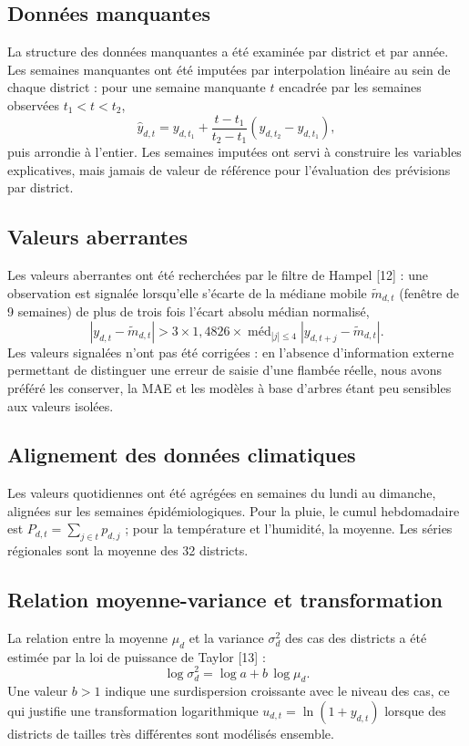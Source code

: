 \documentclass[11pt]{article}
\begin{document}
\subsection{Données manquantes}
La structure des données manquantes a été examinée par district et par année. Les semaines manquantes ont été imputées par interpolation linéaire au sein de chaque district : pour une semaine manquante $t$ encadrée par les semaines observées $t_1<t<t_2$,
\begin{equation}
\hat{y}_{d,t}=y_{d,t_1}+\frac{t-t_1}{t_2-t_1}\left(y_{d,t_2}-y_{d,t_1}\right),
\label{eq:interp}
\end{equation}
puis arrondie à l'entier. Les semaines imputées ont servi à construire les variables explicatives, mais jamais de valeur de référence pour l'évaluation des prévisions par district.

\subsection{Valeurs aberrantes}
Les valeurs aberrantes ont été recherchées par le filtre de Hampel [12] : une observation est signalée lorsqu'elle s'écarte de la médiane mobile $\tilde{m}_{d,t}$ (fenêtre de 9 semaines) de plus de trois fois l'écart absolu médian normalisé,
\begin{equation}
\left|y_{d,t}-\tilde{m}_{d,t}\right|>3\times1{,}4826\times\operatorname{méd}_{|j|\le4}\left|y_{d,t+j}-\tilde{m}_{d,t}\right|.
\label{eq:hampel}
\end{equation}
Les valeurs signalées n'ont pas été corrigées : en l'absence d'information externe permettant de distinguer une erreur de saisie d'une flambée réelle, nous avons préféré les conserver, la MAE et les modèles à base d'arbres étant peu sensibles aux valeurs isolées.

\subsection{Alignement des données climatiques}
Les valeurs quotidiennes ont été agrégées en semaines du lundi au dimanche, alignées sur les semaines épidémiologiques. Pour la pluie, le cumul hebdomadaire est $P_{d,t}=\sum_{j\in t}p_{d,j}$ ; pour la température et l'humidité, la moyenne. Les séries régionales sont la moyenne des 32 districts.

\subsection{Relation moyenne-variance et transformation}
La relation entre la moyenne $\mu_d$ et la variance $\sigma^2_d$ des cas des districts a été estimée par la loi de puissance de Taylor [13] :
\begin{equation}
\log\sigma^2_d=\log a+b\,\log\mu_d .
\label{eq:taylor}
\end{equation}
Une valeur $b>1$ indique une surdispersion croissante avec le niveau des cas, ce qui justifie une transformation logarithmique $u_{d,t}=\ln(1+y_{d,t})$ lorsque des districts de tailles très différentes sont modélisés ensemble.
\end{document}
